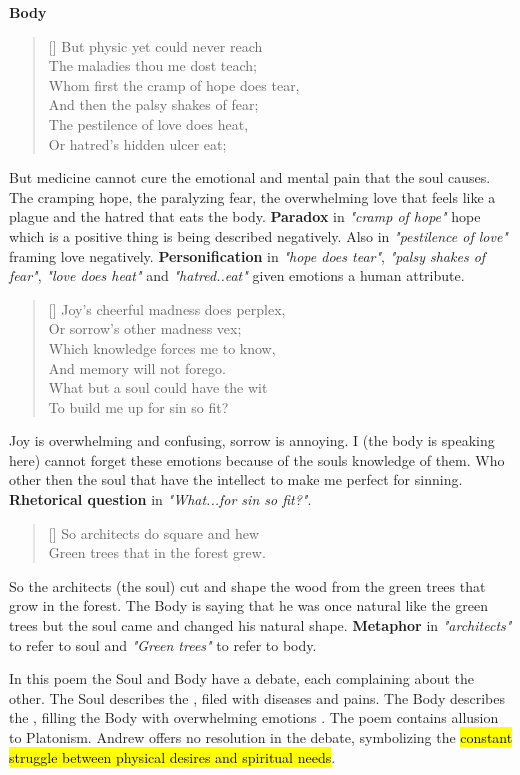 \centerline{\textbf{\large{Body}}}
\begin{verse}[\versewidth]
{\fontverse
But physic yet could never reach\\
The maladies thou me dost teach;\\
Whom first the cramp of hope does tear,\\
And then the palsy shakes of fear;\\
The pestilence of love does heat,\\
Or hatred’s hidden ulcer eat; 
} 
\end{verse}

But medicine cannot cure the emotional and mental pain that the soul
causes. The cramping hope, the paralyzing fear, the overwhelming love
that feels like a plague and the hatred that eats
the body. \textbf{Paradox} in \textit{"cramp of hope"} hope which is a positive
thing is being described negatively. Also in \textit{"pestilence of love"} 
framing love negatively. \textbf{Personification} in
\textit{"hope does tear"}, \textit{"palsy shakes of fear"}, \textit{"love does heat"} and 
\textit{"hatred..eat"} given emotions a human attribute. 

\newpage
\begin{verse}[\versewidth]
{\fontverse
Joy’s cheerful madness does perplex,\\
Or sorrow’s other madness vex;\\
Which knowledge forces me to know,\\
And memory will not forego.\\
What but a soul could have the wit\\
To build me up for sin so fit? 
} 
\end{verse}

Joy is overwhelming and confusing, sorrow is annoying. I 
(the body is speaking here) cannot forget these emotions because 
of the souls knowledge of them. Who other then the soul that have 
the intellect to make me perfect for sinning. \textbf{Rhetorical question}
in \textit{"What...for sin so fit?"}. 

\begin{verse}[\versewidth]
{\fontverse
So architects do square and hew\\
Green trees that in the forest grew.
} 
\end{verse}

So the architects (the soul) cut and shape the wood from
the green trees that grow in the forest. The Body is saying
that he was once natural like the green trees but the soul
came and changed his natural shape. \textbf{Metaphor} 
in \textit{"architects"} to refer to soul
and \textit{"Green trees"} to refer to body.


In this poem the Soul and Body have a debate, each complaining about the 
other. The Soul describes the , filed with diseases and
pains. The Body describes the , filling the Body
with overwhelming emotions . The poem contains allusion to Platonism.
Andrew offers no resolution in the debate, symbolizing the \hl{constant 
struggle between physical desires and spiritual needs}. 

